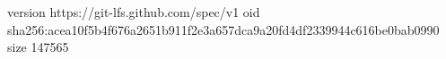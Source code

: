 version https://git-lfs.github.com/spec/v1
oid sha256:acea10f5b4f676a2651b911f2e3a657dca9a20fd4df2339944c616be0bab0990
size 147565
